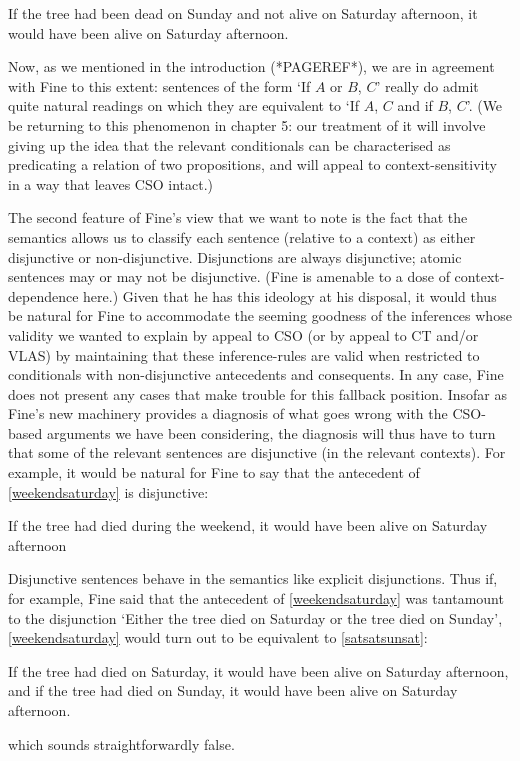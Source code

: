 \documentclass[If.tex]{subfiles}
\begin{document}
\begin{prop}
	\nitem \label{bad}
		If the tree had been dead on Sunday and not alive on Saturday afternoon, it would have been alive on Saturday afternoon.
\end{prop}
Now, as we mentioned in the introduction (*PAGEREF*), we are in agreement with Fine to this extent: sentences of the form ‘If $A$ or $B$, $C$’ really do admit quite natural readings on which they are equivalent to ‘If $A$, $C$ and if $B$, $C$’. (We be returning to this phenomenon in chapter 5: our treatment of it will involve giving up the idea that the relevant conditionals can be characterised as predicating a relation of two propositions, and will appeal to context-sensitivity in a way that leaves CSO intact.)

The second feature of Fine's view that we want to note is the fact that the semantics allows us to classify each sentence (relative to a context) as either disjunctive or non-disjunctive. Disjunctions are always disjunctive; atomic sentences may or may not be disjunctive. (Fine is amenable to a dose of context-dependence here.) Given that he has this ideology at his disposal, it would thus be natural for Fine to accommodate the seeming goodness of the inferences whose validity we wanted to explain by appeal to CSO (or by appeal to CT and/or VLAS) by maintaining that these inference-rules are valid when restricted to conditionals with non-disjunctive antecedents and consequents. In any case, Fine does not present any cases that make trouble for this fallback position. Insofar as Fine's new machinery provides a diagnosis of what goes wrong with the CSO-based arguments we have been considering, the diagnosis will thus have to turn that some of the relevant sentences are disjunctive (in the relevant contexts). For example, it would be natural for Fine to say that the antecedent of \ref{weekendsaturday} is disjunctive:
\begin{prop}
	\nitem \label{weekendsaturday}
		If the tree had died during the weekend, it would have been alive on Saturday afternoon
\end{prop}
Disjunctive sentences behave in the semantics like explicit disjunctions. Thus if, for example, Fine said that the antecedent of \ref{weekendsaturday} was tantamount to the disjunction ‘Either the tree died on Saturday or the tree died on Sunday’, \ref{weekendsaturday} would turn out to be equivalent to \ref{satsatsunsat}:
\begin{prop}
	\nitem \label{satsatsunsat}
		If the tree had died on Saturday, it would have been alive on Saturday afternoon, and if the tree had died on Sunday, it would have been alive on Saturday afternoon.
\end{prop}
which sounds straightforwardly false.
\end{document}
